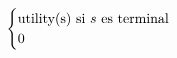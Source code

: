\documentclass[preview]{standalone}
\begin{document}
\begin{align*}
\begin{cases}\text{utility(s) si $s$ es terminal} \cr
                                 0 \cr
                                 \end{cases}
\end{align*}
\end{document}

